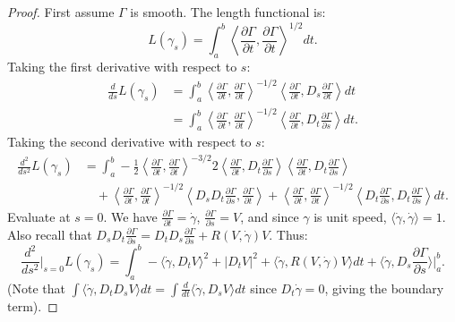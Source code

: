 \documentclass[11pt, a4paper]{article}
\theoremstyle{plain}
\theoremstyle{definition}
\theoremstyle{remark}
\begin{document}
{\begin{proof}
First assume $\Gamma$ is smooth. The length functional is:
\[
L(\gamma_s) = \int_a^b \left\langle \frac{\partial \Gamma}{\partial t}, \frac{\partial \Gamma}{\partial t} \right\rangle^{1/2} dt.
\]
Taking the first derivative with respect to $s$:
\begin{align*}
\frac{d}{ds}L(\gamma_s) &= \int_a^b \left\langle \frac{\partial \Gamma}{\partial t}, \frac{\partial \Gamma}{\partial t} \right\rangle^{-1/2} \left\langle \frac{\partial \Gamma}{\partial t}, D_s \frac{\partial \Gamma}{\partial t} \right\rangle dt \\
&= \int_a^b \left\langle \frac{\partial \Gamma}{\partial t}, \frac{\partial \Gamma}{\partial t} \right\rangle^{-1/2} \left\langle \frac{\partial \Gamma}{\partial t}, D_t \frac{\partial \Gamma}{\partial s} \right\rangle dt.
\end{align*}
Taking the second derivative with respect to $s$:
\begin{align*}
\frac{d^2}{ds^2}L(\gamma_s) &= \int_a^b -\frac{1}{2}\left\langle \frac{\partial \Gamma}{\partial t}, \frac{\partial \Gamma}{\partial t} \right\rangle^{-3/2} 2 \left\langle \frac{\partial \Gamma}{\partial t}, D_t \frac{\partial \Gamma}{\partial s} \right\rangle \left\langle \frac{\partial \Gamma}{\partial t}, D_t \frac{\partial \Gamma}{\partial s} \right\rangle \\
&\quad + \left\langle \frac{\partial \Gamma}{\partial t}, \frac{\partial \Gamma}{\partial t} \right\rangle^{-1/2} \left\langle D_s D_t \frac{\partial \Gamma}{\partial s}, \frac{\partial \Gamma}{\partial t} \right\rangle + \left\langle \frac{\partial \Gamma}{\partial t}, \frac{\partial \Gamma}{\partial t} \right\rangle^{-1/2} \left\langle D_t \frac{\partial \Gamma}{\partial s}, D_t \frac{\partial \Gamma}{\partial s} \right\rangle dt.
\end{align*}
Evaluate at $s=0$. We have $\frac{\partial \Gamma}{\partial t} = \dot{\gamma}$, $\frac{\partial \Gamma}{\partial s} = V$, and since $\gamma$ is unit speed, $\langle \dot{\gamma}, \dot{\gamma} \rangle = 1$. Also recall that $D_s D_t \frac{\partial \Gamma}{\partial s} = D_t D_s \frac{\partial \Gamma}{\partial s} + R(V, \dot{\gamma})V$. Thus:
\[
\frac{d^2}{ds^2}\bigg|_{s=0} L(\gamma_s) = \int_a^b -\langle \dot{\gamma}, D_t V \rangle^2 + |D_t V|^2 + \langle \dot{\gamma}, R(V, \dot{\gamma})V \rangle dt + \langle \dot{\gamma}, D_s \frac{\partial \Gamma}{\partial s} \rangle \Big|_a^b.
\]
(Note that $\int \langle \dot{\gamma}, D_t D_s V \rangle dt = \int \frac{d}{dt} \langle \dot{\gamma}, D_s V \rangle dt$ since $D_t \dot{\gamma} = 0$, giving the boundary term). 


\end{proof}}
\end{document}

